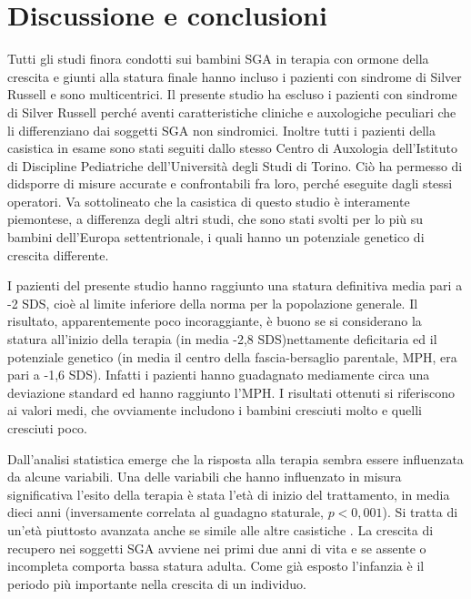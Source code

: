 \chapter{Discussione e conclusioni}


Tutti gli studi finora condotti sui bambini SGA in terapia con ormone della crescita e giunti alla statura finale hanno incluso i pazienti con sindrome di Silver Russell e sono multicentrici. Il presente studio ha escluso i pazienti con sindrome di Silver Russell perché aventi caratteristiche cliniche e auxologiche peculiari che li differenziano dai soggetti SGA non sindromici. Inoltre tutti i pazienti della casistica in esame sono stati seguiti dallo stesso Centro di Auxologia dell'Istituto di Discipline Pediatriche dell'Università degli Studi di Torino. Ciò ha permesso di didsporre di misure accurate e confrontabili fra loro, perché eseguite dagli stessi operatori. Va sottolineato che la casistica di questo studio è interamente piemontese, a differenza degli altri studi, che sono stati svolti per lo più su bambini dell'Europa settentrionale, i quali hanno un potenziale genetico di crescita differente.

I pazienti del presente studio hanno raggiunto una statura definitiva media pari a -2 SDS, cioè al limite inferiore della norma per la popolazione generale. Il risultato, apparentemente poco incoraggiante, è buono se si considerano la statura all'inizio della terapia (in media -2,8 SDS)nettamente deficitaria ed il potenziale genetico (in media il centro della fascia-bersaglio parentale, MPH, era pari a -1,6 SDS). Infatti i pazienti hanno guadagnato mediamente circa una deviazione standard ed hanno raggiunto l'MPH. I risultati ottenuti si riferiscono ai valori medi, che ovviamente includono i bambini cresciuti molto e quelli cresciuti poco. 

Dall'analisi statistica emerge che la risposta alla terapia sembra essere influenzata da alcune variabili.
Una delle variabili che hanno influenzato in misura significativa l'esito della terapia è stata l'età di inizio del trattamento, in media dieci anni (inversamente correlata al guadagno staturale, $p < 0,001$). Si tratta di un'età piuttosto avanzata anche se simile alle altre casistiche\cite{coutant1998short} \cite{zucchini2001final}. La crescita di recupero nei soggetti SGA avviene nei primi due anni di vita e se assente o incompleta comporta bassa statura adulta. Come già esposto l'infanzia è il periodo più importante nella crescita di un individuo. 

